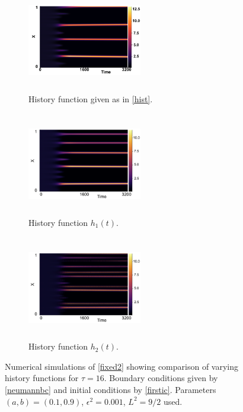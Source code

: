 \begin{figure}[H]
    \centering
    \begin{subfigure}[t]{0.32\textwidth}
        \centering
        \includegraphics[width=5cm,height=4.5cm]{ic216.png}
        \caption{History function given as in \eqref{hist}.}
        \label{}
    \end{subfigure}
    \hfill
    \begin{subfigure}[t]{0.32\textwidth}
        \centering
        \includegraphics[width=5cm,height=4.5cm]{h116.png}
        \caption{History function $h_1(t)$.}
        \label{}
    \end{subfigure}
    \hfill
    \begin{subfigure}[t]{0.32\textwidth}
        \centering
        \includegraphics[width=5cm,height=4.5cm]{h216.png}
        \caption{History function $h_2(t)$.}
        \label{}
    \end{subfigure}
    \caption{Numerical simulations of \eqref{fixed2} showing comparison of varying history functions for $\tau=16$. Boundary conditions given by \eqref{neumannbc} and initial conditions by \eqref{firstic}. Parameters $(a,b)=(0.1,0.9)$, $\epsilon^2=0.001$, $L^2=9/2$ used.}
    \label{fig:temp16}
\end{figure}

